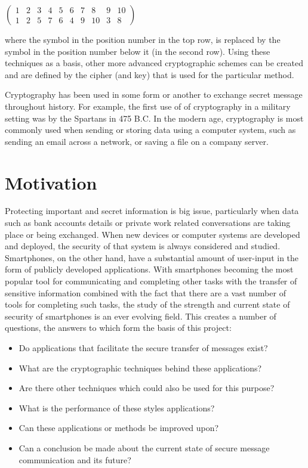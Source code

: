 \documentclass[a4paper,10pt]{report}
\begin{document}
\begin{center}
$
\begin{pmatrix}
  1 & 2 & 3 & 4 & 5 & 6 & 7 & 8 & 9 & 10 \\
  1 & 2 & 5 & 7 & 6 & 4 & 9 & 10 & 3 & 8
 \end{pmatrix}
$
\end{center}

where the symbol in the position number in the top row, is replaced by the symbol in the position number below it (in the second row). Using these techniques as a basis, other more advanced cryptographic schemes can be created and are defined by the cipher (and key) that is used for the particular method.

Cryptography has been used in some form or another to exchange secret message throughout history. For example, the first use of of cryptography in a military setting was by the Spartans in 475 B.C. In the modern age, cryptography is most commonly used when sending or storing data using a computer system, such as sending an email across a network, or saving a file on a company server. 

\section{Motivation}

Protecting important and secret information is big issue, particularly when data such as bank accounts details or private work related conversations are taking place or being exchanged. When new devices or computer systems are developed and deployed, the security of that system is always considered and studied. Smartphones, on the other hand, have a substantial amount of user-input in the form of publicly developed applications. With smartphones becoming the most popular tool for communicating and completing other tasks with the transfer of sensitive information combined with the fact that there are a vast number of tools for completing such tasks, the study of the strength and current state of security of smartphones is an ever evolving field. This creates a number of questions, the answers to which form the basis of this project:

\begin{itemize}
 \item Do applications that facilitate the secure transfer of messages exist?
 \item What are the cryptographic techniques behind these applications?
 \item Are there other techniques which could also be used for this purpose?
 \item What is the performance of these styles applications?
 \item Can these applications or methods be improved upon?
 \item Can a conclusion be made about the current state of secure message communication and its future? 
\end{itemize}
\end{document}
